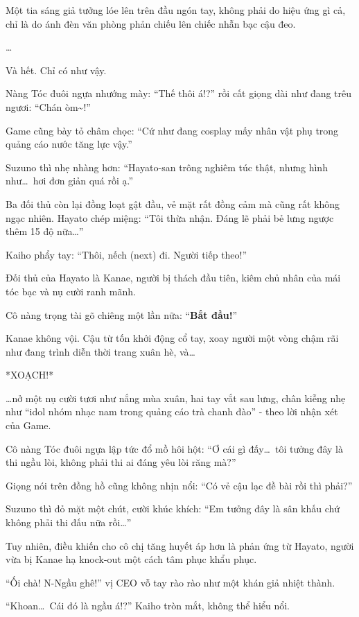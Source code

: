 \documentclass[../main.tex]{subfiles}
\begin{document}
Một tia sáng giả tưởng lóe lên trên đầu ngón tay, không phải do hiệu ứng gì cả, chỉ là do ánh đèn văn phòng phản chiếu lên chiếc nhẫn bạc cậu đeo.

\dots

Và hết. Chỉ có như vậy.

Nàng Tóc đuôi ngựa nhướng mày: ``Thế thôi á!?'' rồi cất giọng dài như đang trêu ngươi: ``Chán òm\~{}!''

Game cũng bày tỏ châm chọc: ``Cứ như đang cosplay mấy nhân vật phụ trong quảng cáo nước tăng lực vậy.''

Suzuno thì nhẹ nhàng hơn: ``Hayato-san trông nghiêm túc thật, nhưng hình như\dots\ hơi đơn giản quá rồi ạ.''

Ba đối thủ còn lại đồng loạt gật đầu, vẻ mặt rất đồng cảm mà cũng rất không ngạc nhiên. Hayato chép miệng: ``Tôi thừa nhận. Đáng lẽ phải bẻ lưng ngược thêm 15 độ nữa\dots''

Kaiho phẩy tay: ``Thôi, nếch (next) đi. Người tiếp theo!''

\ct

Đối thủ của Hayato là Kanae, người bị thách đầu tiên, kiêm chủ nhân của mái tóc bạc và nụ cười ranh mãnh.

Cô nàng trọng tài gõ chiêng một lần nữa: ``\textbf{Bắt đầu!}''

Kanae không vội. Cậu từ tốn khởi động cổ tay, xoay người một vòng chậm rãi như đang trình diễn thời trang xuân hè, và\dots

*XOẠCH!*


\dots nở một nụ cười tươi như nắng mùa xuân, hai tay vắt sau lưng, chân kiễng nhẹ như ``idol nhóm nhạc nam trong quảng cáo trà chanh đào'' - theo lời nhận xét của Game.

Cô nàng Tóc đuôi ngựa lập tức đổ mồ hôi hột: ``Ơ cái gì đấy\dots\ tôi tưởng đây là thi ngầu lòi, không phải thi ai đáng yêu lòi răng mà?''

Giọng nói trên đồng hồ cũng không nhịn nổi: ``Có vẻ cậu lạc đề bài rồi thì phải?''

Suzuno thì đỏ mặt một chút, cười khúc khích: ``Em tưởng đây là sân khấu chứ không phải thi đấu nữa rồi\dots''

Tuy nhiên, điều khiến cho cô chị tăng huyết áp hơn là phản ứng từ Hayato, người vừa bị Kanae hạ knock-out một cách tâm phục khẩu phục.

``Ối chà! N-Ngầu ghê!'' vị CEO vỗ tay rào rào như một khán giả nhiệt thành.

``Khoan\dots\ Cái đó là ngầu á!?'' Kaiho tròn mắt, không thể hiểu nổi.
\end{document}
